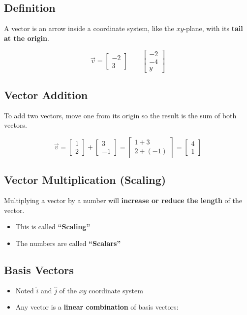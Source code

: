 \subsection{Definition}
\begin{defbox}
A vector is an arrow inside a coordinate system, like the $xy$-plane, with its \textbf{tail at the origin}.
\end{defbox}

\[
\vec{v} = \begin{bmatrix} -2 \\ 3 \end{bmatrix}
\qquad
\begin{bmatrix} -2 \\ -4 \\ y \end{bmatrix}
\]

\subsection{Vector Addition}
To add two vectors, move one from its origin so the result is the sum of both vectors.

\[
\vec{v} = \begin{bmatrix} 1 \\ 2 \end{bmatrix} + \begin{bmatrix} 3 \\ -1 \end{bmatrix}
= \begin{bmatrix} 1+3 \\ 2+(-1) \end{bmatrix}
= \begin{bmatrix} 4 \\ 1 \end{bmatrix}
\]

\subsection{Vector Multiplication (Scaling)}
Multiplying a vector by a number will \textbf{increase or reduce the length} of the vector.
\begin{itemize}[nosep]
  \item This is called \textbf{``Scaling''}
  \item The numbers are called \textbf{``Scalars''}
\end{itemize}

\subsection{Basis Vectors}
\begin{itemize}[nosep]
  \item Noted $\hat{i}$ and $\hat{j}$ of the $xy$ coordinate system
  \item Any vector is a \textbf{linear combination} of basis vectors:
\end{itemize}

